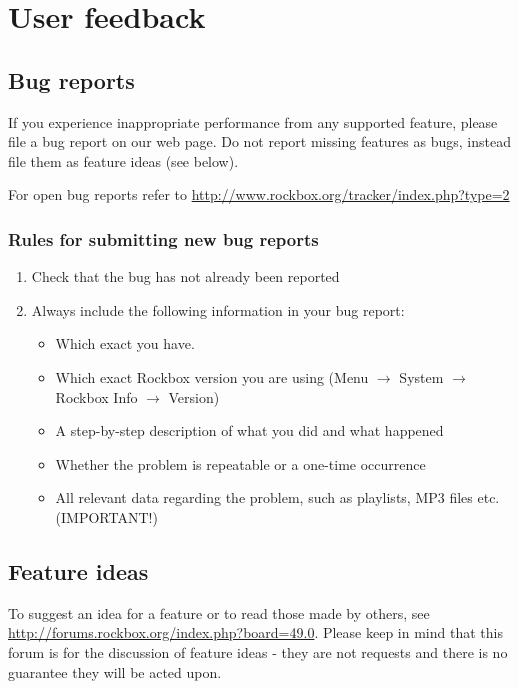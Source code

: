 \appendix









\chapter{User feedback}\label{sec:feedback}
\section{Bug reports}
If you experience inappropriate performance from any supported feature,
please file a bug report on our web page. Do not report missing
features as bugs, instead file them as feature ideas (see below).

For open bug reports refer to
\url{http://www.rockbox.org/tracker/index.php?type=2}

\subsection{Rules for submitting new bug reports}

\begin{enumerate}
\item  Check that the bug has not already been reported
\item  Always include the following information in your bug report:

\begin{itemize}
\item  Which exact \dap{} you have.
\item  Which exact Rockbox version you are using
(Menu $\rightarrow$ System $\rightarrow$ Rockbox Info $\rightarrow$ Version)
\item  A step{}-by{}-step description of what you did and what happened
\item  Whether the problem is repeatable or a one{}-time occurrence
\item  All relevant data regarding the problem, such as playlists, MP3
files etc. (IMPORTANT!)
\end{itemize}
\end{enumerate}

\section{Feature ideas}
To suggest an idea for a feature or to read those made by others, see
\url{http://forums.rockbox.org/index.php?board=49.0}.  Please keep in
mind that this forum is for the discussion of feature ideas - they are not
 requests and there is no guarantee they will be acted upon.


